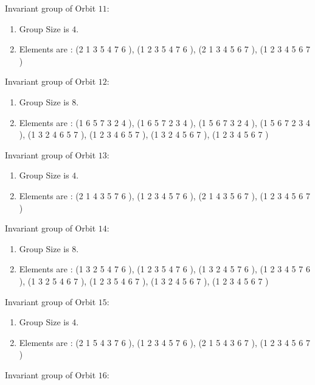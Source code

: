 \documentclass[12pt]{article}
\begin{document}
Invariant group of Orbit $11$:
\begin{enumerate}
\item Group Size is $4$.
\item Elements are : (2 1 3 5 4 7 6  ), (1 2 3 5 4 7 6  ), (2 1 3 4 5 6 7  ), (1 2 3 4 5 6 7  )
\end{enumerate}
Invariant group of Orbit $12$:
\begin{enumerate}
\item Group Size is $8$.
\item Elements are : (1 6 5 7 3 2 4  ), (1 6 5 7 2 3 4  ), (1 5 6 7 3 2 4  ), (1 5 6 7 2 3 4  ), (1 3 2 4 6 5 7  ), (1 2 3 4 6 5 7  ), (1 3 2 4 5 6 7  ), (1 2 3 4 5 6 7  )
\end{enumerate}
Invariant group of Orbit $13$:
\begin{enumerate}
\item Group Size is $4$.
\item Elements are : (2 1 4 3 5 7 6  ), (1 2 3 4 5 7 6  ), (2 1 4 3 5 6 7  ), (1 2 3 4 5 6 7  )
\end{enumerate}
Invariant group of Orbit $14$:
\begin{enumerate}
\item Group Size is $8$.
\item Elements are : (1 3 2 5 4 7 6  ), (1 2 3 5 4 7 6  ), (1 3 2 4 5 7 6  ), (1 2 3 4 5 7 6  ), (1 3 2 5 4 6 7  ), (1 2 3 5 4 6 7  ), (1 3 2 4 5 6 7  ), (1 2 3 4 5 6 7  )
\end{enumerate}
Invariant group of Orbit $15$:
\begin{enumerate}
\item Group Size is $4$.
\item Elements are : (2 1 5 4 3 7 6  ), (1 2 3 4 5 7 6  ), (2 1 5 4 3 6 7  ), (1 2 3 4 5 6 7  )
\end{enumerate}
Invariant group of Orbit $16$:
\end{document}
